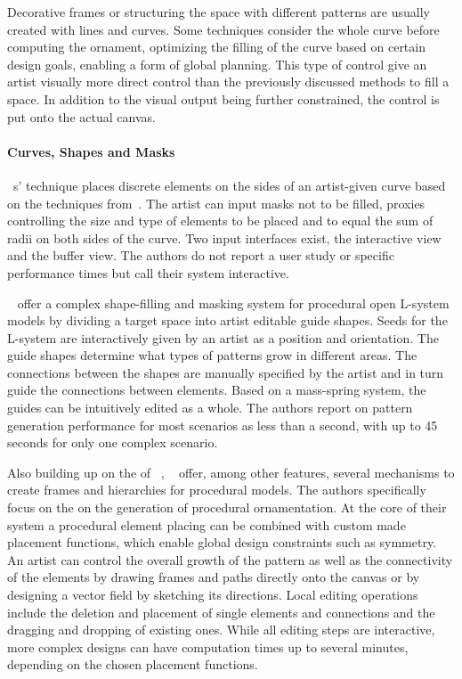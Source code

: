 Decorative frames or structuring the space with different patterns are usually created with lines and curves. Some techniques consider the whole curve before computing the ornament, optimizing the filling of the curve based on certain design goals, enabling a form of global planning. This type of control give an artist visually more direct control than the previously discussed methods to fill a space. In addition to the visual output being further constrained, the control is put onto the actual canvas. 

\paragraph*{Curves, Shapes and Masks} \citeauthor*{anderson_2008_udt}~\cite{anderson_2008_udt}s' technique places discrete elements on the sides of an artist-given curve based on the techniques from~\cite{wong_1998_cgf}. The artist can input masks not to be filled, proxies controlling the size and type of elements to be placed and to equal the sum of radii on both sides of the curve. Two input interfaces exist, the interactive view and the buffer view. The authors do not report a user study or specific performance times but call their system interactive.  

\citeauthor*{benes_2011_gpm}~\cite{benes_2011_gpm} offer a complex shape-filling and masking system for procedural open L-system models by dividing a target space into artist editable guide shapes. Seeds for the L-system are interactively given by an artist as a position and orientation. The guide shapes determine what types of patterns grow in different areas. The connections between the shapes are manually specified by the artist and in turn guide the connections between elements. Based on a mass-spring system, the guides can be intuitively edited as a whole. The authors report on pattern generation performance for most scenarios as less than a second, with up to 45 seconds for only one complex scenario.

Also building up on the of \citeauthor*{wong_1998_cgf}~\cite{wong_1998_cgf}, \citeauthor*{gieseke_2017_ooo}~\cite{gieseke_2017_ooo} offer, among other features, several mechanisms to create frames and hierarchies for procedural models. The authors specifically focus on the on the generation of procedural ornamentation. At the core of their system a procedural element placing can be combined with custom made placement functions, which enable global design constraints such as symmetry. An artist can control the overall growth of the pattern as well as the connectivity of the elements by drawing frames and paths directly onto the canvas or by designing a vector field by sketching its directions. Local editing operations include the deletion and placement of single elements and connections and the dragging and dropping of existing ones. While all editing steps are interactive, more complex designs can have computation times up to several minutes, depending on the chosen placement functions.

